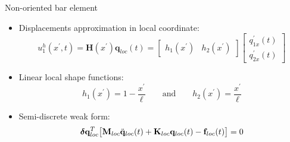 \documentclass[aspectratio=169]{beamer}
\begin{document}
{\begin{frame}{Non-oriented bar element}
    \begin{itemize}
      \item Displacements approximation in local coordinate:
            \[u^h_1(x^\prime,t)=  \mathbf H(x^\prime)\mathbf q_{loc} (t)=\begin{bmatrix}  h_1(x^\prime) & h_2(x^\prime)\end{bmatrix} \begin{bmatrix}  q_{1x}^\prime(t) \\ q_{2x}^\prime(t)\end{bmatrix}\]
      \item Linear local shape functions:
            $$h_1(x^\prime)  =1-\frac{x^\prime}{\ell} \qquad\text{and}\qquad h_2(x^\prime)  =\frac{x^\prime}{\ell}$$
      \item Semi-discrete weak form:
            \[\boldsymbol\delta\mathbf{q}_{loc}^T\big[\mathbf{M}_{loc} \ddot{\mathbf{q}}_{loc}(t) + \mathbf{K}_{loc} \mathbf{q}_{loc}(t) - \mathbf{f}_{loc}(t)\big]=0 \]
    \end{itemize}
  \end{frame}

}
\end{document}
